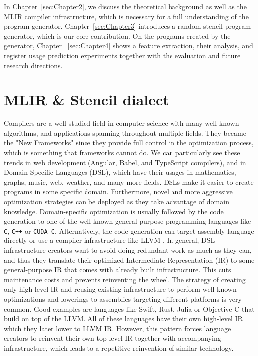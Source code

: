 \documentclass[sigplan,\review anonymous]{acmart}
\begin{document}
In Chapter~\ref{sec:Chapter2}, we discuss the theoretical background
as well as the MLIR compiler infrastructure, which is necessary for a
full understanding of the program generator. Chapter~\ref{sec:Chapter3}
introduces a random stencil program generator, which is our core contribution.
On the programs created by the generator, Chapter ~\ref{sec:Chapter4}
shows a feature extraction, their analysis, and register usage
prediction experiments together with the evaluation and future research
directions.

\section{MLIR \& Stencil dialect \label{sec:Chapter2}}

Compilers are a well-studied field in computer science with many well-known
algorithms, and applications spanning throughout multiple fields. They became
the "New Frameworks" since they provide full control in the optimization
process, which is something that frameworks cannot do. We can particularly
see these trends in web development (Angular, Babel, and TypeScript compilers),
and in Domain-Specific Languages (DSL), which have their usages in mathematics,
graphs, music, web, weather, and many more fields. DSLs make it easier to
create programs in some specific domain. Furthermore, novel and more aggressive
optimization strategies can be deployed as they take advantage of domain
knowledge. Domain-specific optimization is usually followed by the code
generation to one of the well-known general-purpose programming languages
like \texttt{C}, \texttt{C++} or \texttt{CUDA C}. Alternatively, the code
generation can target assembly language directly or use a compiler
infrastructure like LLVM \cite{llvm}. In general, DSL infrastructure creators
want to avoid doing redundant work as much as they can, and thus they translate
their optimized Intermediate Representation (IR) to some general-purpose IR
that comes with already built infrastructure. This cuts maintenance costs
and prevents reinventing the wheel. The strategy of creating only high-level
IR and reusing existing infrastructure to perform well-known optimizations
and lowerings to assemblies targeting different platforms is very common.
Good examples are languages like Swift, Rust, Julia or Objective C that build
on top of the LLVM. All of these languages have their own high-level IR which
they later lower to LLVM IR. However, this pattern forces language creators to
reinvent their own top-level IR together with accompanying infrastructure,
which leads to a repetitive reinvention of similar technology.
\end{document}

